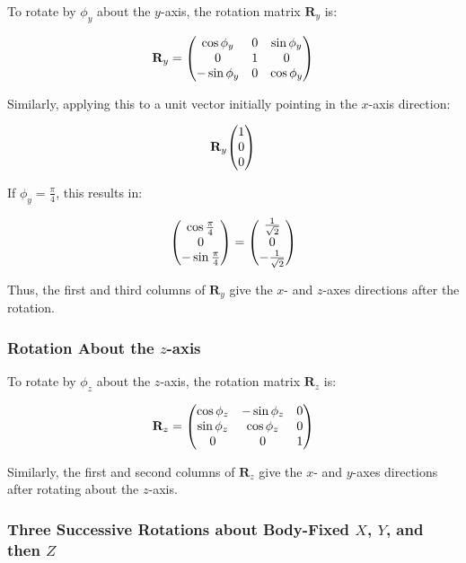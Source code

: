 \documentclass{article}
\begin{document}
To rotate by \( \phi_y \) about the \( y \)-axis, the rotation matrix \( \mathbf{R}_y \) is:

\begin{equation}
\mathbf{R}_y = \mqty(
\cos \phi_y & 0 & \sin \phi_y \\
0 & 1 & 0 \\
-\sin \phi_y & 0 & \cos \phi_y
)
\end{equation}

Similarly, applying this to a unit vector initially pointing in the \( x \)-axis direction:

\begin{equation}
\mathbf{R}_y \mqty( 1 \\ 0 \\ 0 )
\end{equation}

If \( \phi_y = \frac{\pi}{4} \), this results in:

\begin{equation}
\mqty( \cos \frac{\pi}{4} \\ 0 \\ -\sin \frac{\pi}{4} ) = \mqty( \frac{1}{\sqrt{2}} \\ 0 \\ -\frac{1}{\sqrt{2}} )
\end{equation}

Thus, the first and third columns of \( \mathbf{R}_y \) give the \( x \)- and \( z \)-axes directions after the rotation.

\subsubsection*{Rotation About the \( z \)-axis}

To rotate by \( \phi_z \) about the \( z \)-axis, the rotation matrix \( \mathbf{R}_z \) is:

\begin{equation}
\mathbf{R}_z = \mqty(
\cos \phi_z & -\sin \phi_z & 0 \\
\sin \phi_z & \cos \phi_z & 0 \\
0 & 0 & 1
)
\end{equation}

Similarly, the first and second columns of \( \mathbf{R}_z \) give the \( x \)- and \( y \)-axes directions after rotating about the \( z \)-axis.


\subsubsection*{Three Successive Rotations about Body-Fixed \( X \), \( Y \), and then \( Z \)}
\end{document}
